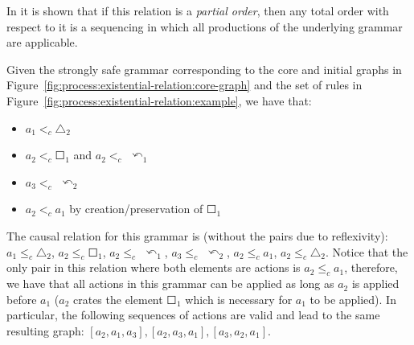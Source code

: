 In \cite{Corradini1996} it is shown that if this relation is a \emph{partial order}, then any total order with respect to it is a sequencing in which all productions of the underlying grammar are applicable.

\begin{example}\label{ex:process:existential-relation} Given the strongly safe grammar corresponding to the core and initial graphs in Figure~\ref{fig:process:existential-relation:core-graph} and the set of rules in Figure~\ref{fig:process:existential-relation:example}, we have that:

\begin{itemize}
  \item $a_1 <_c \triangle_2$
  \item $a_2 <_c \Square_1$ and $a_2 <_c$ $\curvearrowleft_1$
  \item $a_3 <_c$ $\curvearrowleft_2$
  \item $a_2 <_c a_1$ by creation/preservation of $\Square_1$
\end{itemize}

  The causal relation for this grammar is (without the pairs due to reflexivity): $a_1 \leq_c \triangle_2$, $a_2 \leq_c \Square_1$, $a_2 \leq_c$ $\curvearrowleft_1$, $a_3 \leq_c$ $\curvearrowleft_2$, $a_2 \leq_c a_1$, $a_2 \leq_c \triangle_2$. Notice that the only pair in this relation where both elements are actions is \mbox{$a_2 \leq_c a_1$}, therefore, we have that all actions in this grammar can be applied as long as $a_2$ is applied before $a_1$ ($a_2$ crates the element $\Square_1$
  which is necessary for $a_1$ to be applied). In particular, the following sequences of actions are valid and lead to the same resulting graph: $[a_2,a_1,a_3],[a_2,a_3,a_1],[a_3,a_2,a_1]$.


\end{example}
